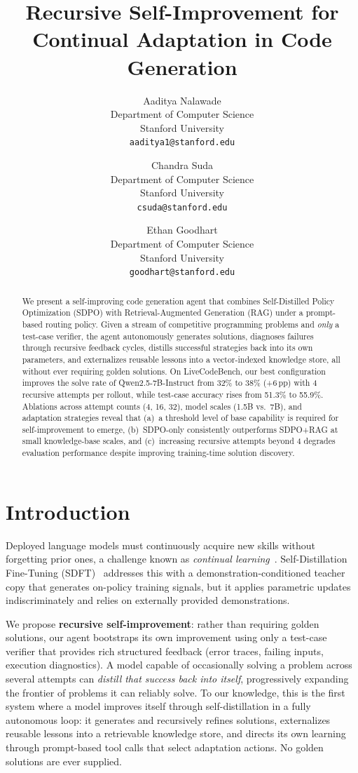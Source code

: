 \documentclass[11pt]{article}
\title{Recursive Self-Improvement for Continual Adaptation in Code Generation}
\author{
  Aaditya Nalawade \\
  Department of Computer Science\\
  Stanford University\\
  \texttt{aaditya1@stanford.edu}
  \and
  Chandra Suda \\
  Department of Computer Science\\
  Stanford University\\
  \texttt{csuda@stanford.edu}
  \and
  Ethan Goodhart \\
  Department of Computer Science\\
  Stanford University\\
  \texttt{goodhart@stanford.edu}
}
\date{}
\begin{document}
\maketitle

\begin{abstract}
We present a self-improving code generation agent that combines Self-Distilled Policy Optimization (SDPO) with Retrieval-Augmented Generation (RAG) under a prompt-based routing policy. Given a stream of competitive programming problems and \emph{only} a test-case verifier, the agent autonomously generates solutions, diagnoses failures through recursive feedback cycles, distills successful strategies back into its own parameters, and externalizes reusable lessons into a vector-indexed knowledge store, all without ever requiring golden solutions. On LiveCodeBench, our best configuration improves the solve rate of Qwen2.5-7B-Instruct from 32\% to 38\% (+6\,pp) with 4 recursive attempts per rollout, while test-case accuracy rises from 51.3\% to 55.9\%. Ablations across attempt counts (4, 16, 32), model scales (1.5B vs.\ 7B), and adaptation strategies reveal that (a)~a threshold level of base capability is required for self-improvement to emerge, (b)~SDPO-only consistently outperforms SDPO+RAG at small knowledge-base scales, and (c)~increasing recursive attempts beyond 4 degrades evaluation performance despite improving training-time solution discovery.
\end{abstract}

\section{Introduction}

Deployed language models must continuously acquire new skills without forgetting prior ones, a challenge known as \emph{continual learning}~\citep{kirkpatrick2017forgetting}. Self-Distillation Fine-Tuning (SDFT)~\citep{shenfeld2026sdft} addresses this with a demonstration-conditioned teacher copy that generates on-policy training signals, but it applies parametric updates indiscriminately and relies on externally provided demonstrations.

We propose \textbf{recursive self-improvement}: rather than requiring golden solutions, our agent bootstraps its own improvement using only a test-case verifier that provides rich structured feedback (error traces, failing inputs, execution diagnostics). A model capable of occasionally solving a problem across several attempts can \emph{distill that success back into itself}, progressively expanding the frontier of problems it can reliably solve. To our knowledge, this is the first system where a model improves itself through self-distillation in a fully autonomous loop: it generates and recursively refines solutions, externalizes reusable lessons into a retrievable knowledge store, and directs its own learning through prompt-based tool calls that select adaptation actions. No golden solutions are ever supplied.
\end{document}
